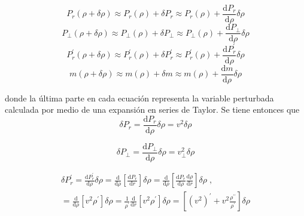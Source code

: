 \documentclass[letterpaper,11pt]{article}
\begin{document}
\begin{equation}
P_{r} (\rho + \delta \rho) \approx P_{r} (\rho) + \delta P_{r} \approx P_{r} (\rho) + \frac{\mathrm{d} P_{r}}{\mathrm{d} \rho} \delta \rho
\end{equation}
\begin{equation}
P_{\perp} (\rho + \delta \rho) \approx P_{\perp} (\rho) + \delta P_{\perp} \approx P_{\perp} (\rho) + \frac{\mathrm{d} P_{\perp}}{\mathrm{d} \rho} \delta \rho
\end{equation}
\begin{equation}
P_{r}^{\prime} (\rho + \delta \rho) \approx P_{r}^{\prime} (\rho) + \delta P_{r}^{\prime} \approx P_{r}^{\prime} (\rho) + \frac{\mathrm{d} P_{r}^{\prime}}{\mathrm{d} \rho} \delta \rho
\end{equation}
\begin{equation}
m (\rho + \delta \rho) \approx m (\rho) + \delta m \approx m (\rho) + \frac{\mathrm{d} m}{\mathrm{d} \rho} \delta \rho
\end{equation}

donde la última parte en cada ecuación representa la variable perturbada calculada por medio de una expansión en series de Taylor. Se tiene entonces que
\begin{equation}
\delta P_{r} = \frac{\mathrm{d} P_{r}}{\mathrm{d} \rho} \delta \rho = v^2 \delta \rho
\end{equation}

\begin{equation}
\delta P_{\perp} = \frac{\mathrm{d} P_{\perp}}{\mathrm{d} \rho} \delta \rho = v^{2}_{\perp} \delta \rho
\end{equation}

\begin{equation}
\label{fracking}
\begin{aligned}
\delta P_{r}^{\prime} = \frac{\mathrm{d} P_{r}^{\prime}}{\mathrm{d} \rho} \delta \rho = \frac{\mathrm{d}}{\mathrm{d} \rho} \left[\frac{\mathrm{d} P_{r}}{\mathrm{d} r} \right] \delta \rho = \frac{\mathrm{d}}{\mathrm{d} \rho} \left[\frac{\mathrm{d} P_{r}}{\mathrm{d} \rho} \frac{\mathrm{d} \rho}{\mathrm{d} r} \right] \delta \rho \; , \\ = \frac{\mathrm{d}}{\mathrm{d}\rho} \left[v^{2} \rho^{\prime} \right] \delta \rho = \frac{1}{\rho^{\prime}} \frac{\mathrm{d}}{\mathrm{d} r} \left[v^{2} \rho^{\prime} \right] \delta \rho = \left[ {\left(v^{2} \right)}^{\prime} + v^{2} \frac{\rho^{\prime \prime}}{\rho^{\prime}} \right] \delta \rho
\end{aligned}
\end{equation}
\end{document}
